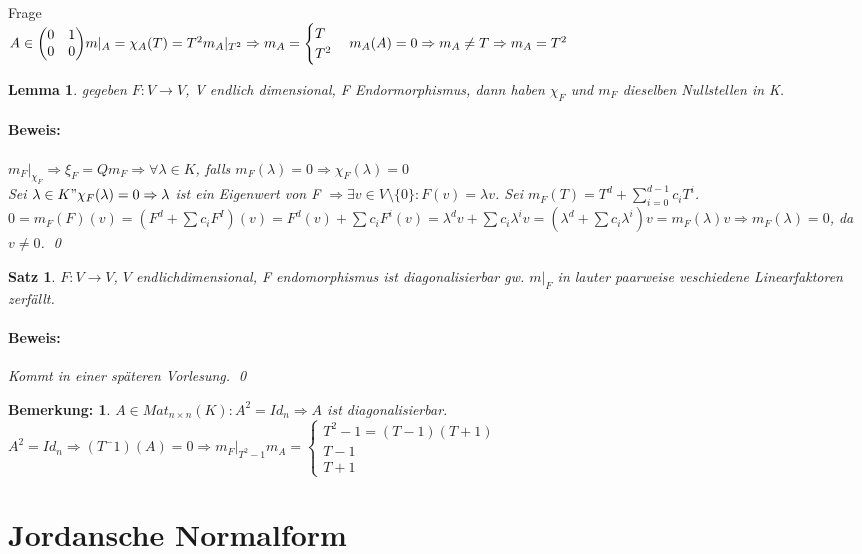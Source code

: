 \documentclass{report}
\newcommand{\lb}{\lambda}
\newcommand{\ve}[1]{{\begin{pmatrix}#1 \end{pmatrix}}}
\theoremstyle{customrem}
\newtheorem*{bemerkung}{Bemerkung\textnormal:}
\theoremstyle{customdef}
\newtheorem{lemma}[definition]{Lemma}
\newtheorem{satz}[definition]{Satz}
\renewenvironment{proof}{\paragraph{Beweis: }}{\qed}
\theoremstyle{customenv}
\begin{document}
Frage\\
\(A \in \ve{0 & 1 \\ 0 & 0}
m|_A = \\
\chi_A(T) = T^2
m_A|_{T^2} \Rightarrow m_A = \begin{cases} T \\ T^2 \end{cases}
m_A(A) = 0 \Rightarrow m_A \neq T \Rightarrow m_A = T^2
\)

\begin{lemma}
  gegeben \(F : V \to V\), V endlich dimensional, F Endormorphismus, dann haben
  \(\chi_F\) und \(m_F\) dieselben Nullstellen in K.
  \begin{proof}
    \(m_F|_{\chi_F} \Rightarrow \xi_F = Q m_F \Rightarrow \forall \lb \in K\),
    falls \(m_F(\lb) = 0 \Rightarrow \chi_F(\lb) = 0\)\\
    Sei \(\lb \in K " \chi_F(\lb) = 0 \Rightarrow \lb \) ist ein Eigenwert von F
    \(\Rightarrow \exists v \in V \setminus \{0\} : F(v) = \lb v\). Sei \(m_F(T)
    = T^d + \sum_{i=0}^{d-1} c_i T^i\). \(0 = m_F(F)(v) = (F^d + \sum c_iF^I)(v)
    = F^d(v) + \sum c_i F^i(v)
    = \lb^d v + \sum c_i \lb^i v
    = (\lb^d + \sum c_i \lb^i) v
    = m_F(\lb) v
    \Rightarrow m_F(\lb) = 0\), da \(v \neq 0\).
  \end{proof}
\end{lemma}

\begin{satz}
  \(F : V \to V\), \(V\) endlichdimensional, F endomorphismus ist
  diagonalisierbar gw. \(m|_F\) in lauter paarweise veschiedene Linearfaktoren
  zerf\"allt.
  \begin{proof}
    Kommt in einer sp\"ateren Vorlesung.
  \end{proof}
\end{satz}

\begin{bemerkung}
  \(A \in Mat_{n \times n}(K) : A^2 = Id_n \Rightarrow A\) ist diagonalisierbar.\\
  \(A^2 = Id_n \Rightarrow (T^ - 1)(A) = 0 \Rightarrow m_F|_{T^2 - 1}
  m_A = \begin{cases}T^2 - 1 = (T - 1)(T + 1) \\ T - 1 \\ T + 1\end{cases}
  \)
\end{bemerkung}

\section*{Jordansche Normalform}
\end{document}
